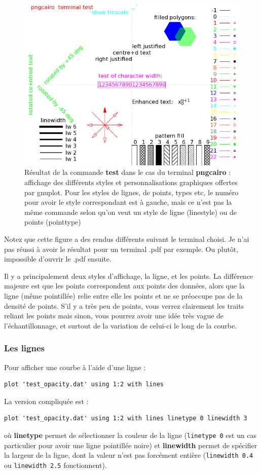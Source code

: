 \documentclass[a4paper,twoside]{article}
\begin{document}
\begin{figure}[htb]
\centering
\includegraphics[width=0.65\linewidth]{figures/test_styles.png}
\caption{Résultat de la commande \textbf{test} dans le cas du terminal \textbf{pngcairo} : affichage des différents styles et personnalisations graphiques offertes par gnuplot. Pour les styles de lignes, de points, types etc, le numéro pour avoir le style correspondant est à gauche, mais ce n'est pas la même commande selon qu'on veut un style de ligne (linestyle) ou de points (pointtype)}\label{fig:styles}
\end{figure}

Notez que cette figure a des rendus différents suivant le terminal choisi. Je n'ai pas réussi à avoir le résultat pour un terminal .pdf par exemple. Ou plutôt, impossible d'ouvrir le .pdf ensuite.

\bigskip

Il y a principalement deux styles d'affichage, la ligne, et les points. La différence majeure est que les points correspondent aux points des données, alors que la ligne (même pointillée) relie entre elle les points et ne se préoccupe pas de la densité de points. S'il y a très peu de points, vous verrez clairement les traits reliant les points mais sinon, vous pourrez avoir une idée très vague de l'échantillonnage, et surtout de la variation de celui-ci le long de la courbe.

\subsubsection{Les lignes}
Pour afficher une courbe à l'aide d'une ligne : 
\begin{verbatim}
plot 'test_opacity.dat' using 1:2 with lines
\end{verbatim}

La version compliquée est :
\begin{verbatim}
plot 'test_opacity.dat' using 1:2 with lines linetype 0 linewidth 3 
\end{verbatim}
où \textbf{linetype} permet de sélectionner la couleur de la ligne (\texttt{linetype 0} est un cas particulier pour avoir une ligne pointillée noire) et \textbf{linewidth} permet de spécifier la largeur de la ligne, dont la valeur n'est pas forcément entière (\texttt{linewidth 0.4} ou \texttt{linewidth 2.5} fonctionnent).
\end{document}
